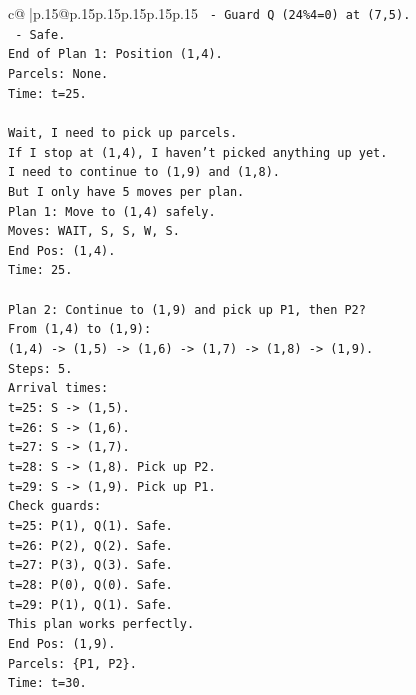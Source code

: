 \documentclass{article}
\begin{document}
{\begin{supertabular}{c@{$\;$}|p{.15\linewidth}@{}p{.15\linewidth}p{.15\linewidth}p{.15\linewidth}p{.15\linewidth}p{.15\linewidth}}
{{{\texttt{  {-} Guard Q (24\%4=0) at (7,5).} \\
\texttt{  {-} Safe.} \\
\texttt{End of Plan 1: Position (1,4).} \\
\texttt{Parcels: None.} \\
\texttt{Time: t=25.} \\
\\ 
\texttt{Wait, I need to pick up parcels.} \\
\texttt{If I stop at (1,4), I haven't picked anything up yet.} \\
\texttt{I need to continue to (1,9) and (1,8).} \\
\texttt{But I only have 5 moves per plan.} \\
\texttt{Plan 1: Move to (1,4) safely.} \\
\texttt{Moves: WAIT, S, S, W, S.} \\
\texttt{End Pos: (1,4).} \\
\texttt{Time: 25.} \\
\\ 
\texttt{Plan 2: Continue to (1,9) and pick up P1, then P2?} \\
\texttt{From (1,4) to (1,9):} \\
\texttt{(1,4) {-}> (1,5) {-}> (1,6) {-}> (1,7) {-}> (1,8) {-}> (1,9).} \\
\texttt{Steps: 5.} \\
\texttt{Arrival times:} \\
\texttt{t=25: S {-}> (1,5).} \\
\texttt{t=26: S {-}> (1,6).} \\
\texttt{t=27: S {-}> (1,7).} \\
\texttt{t=28: S {-}> (1,8). Pick up P2.} \\
\texttt{t=29: S {-}> (1,9). Pick up P1.} \\
\texttt{Check guards:} \\
\texttt{t=25: P(1), Q(1). Safe.} \\
\texttt{t=26: P(2), Q(2). Safe.} \\
\texttt{t=27: P(3), Q(3). Safe.} \\
\texttt{t=28: P(0), Q(0). Safe.} \\
\texttt{t=29: P(1), Q(1). Safe.} \\
\texttt{This plan works perfectly.} \\
\texttt{End Pos: (1,9).} \\
\texttt{Parcels: \{P1, P2\}.} \\
\texttt{Time: t=30.} \\
}}}
\end{supertabular}}
\end{document}
